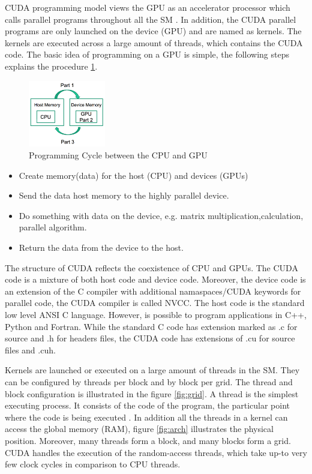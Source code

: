 CUDA programming model views the GPU as an accelerator processor which calls parallel programs throughout all the SM \cite{handbook}. In addition, the CUDA parallel programs are only launched on the device (GPU) and are named as kernels. The kernels are executed across a large amount of threads, which contains the CUDA code. The basic idea of programming on a GPU is simple, the following steps explains the procedure \ref{fig:cycle}.

\begin{figure}[htbp]
	\centering
		\includegraphics[width=0.3\textwidth]{Figures/cycle.png}
		\smallskip
	\caption[Programming Cycle]{Programming Cycle between the CPU and GPU \cite{example}}
	\label{fig:cycle}
\end{figure}

\begin{itemize}
\item Create memory(data) for the host (CPU) and devices (GPUs)
\item Send the data host memory to the highly parallel device.
\item Do something with data on the device, e.g. matrix multiplication,calculation, parallel algorithm.
\item Return the data from the device to the host.
\end{itemize}

The structure of CUDA reflects the coexistence of CPU and GPUs. The CUDA code is a mixture of both host code and device code. Moreover, the device code is an extension of the C compiler with additional namaspaces/CUDA keywords for parallel code, the CUDA compiler is called NVCC. The host code is the standard low level ANSI C language. However, is possible to program applications in C++, Python and Fortran. While the standard C code has extension marked as .c for source and .h for headers files, the CUDA code has extensions of .cu for source files and .cuh.

Kernels are launched or executed on a large amount of threads in the SM. They can be configured by threads per block and by block per grid. The thread and block configuration is illustrated in the figure \ref{fig:grid}. A thread is the simplest executing process. It consists of the code of the program, the particular point where the code is being executed \cite{hwu}. In addition all the threads in a kernel can access the global memory (RAM), figure  \ref{fig:arch} illustrates the physical position. Moreover, many threads form a block, and many blocks form a grid. CUDA handles the execution of the random-access threads, which take up-to very few clock cycles in comparison to CPU threads.

